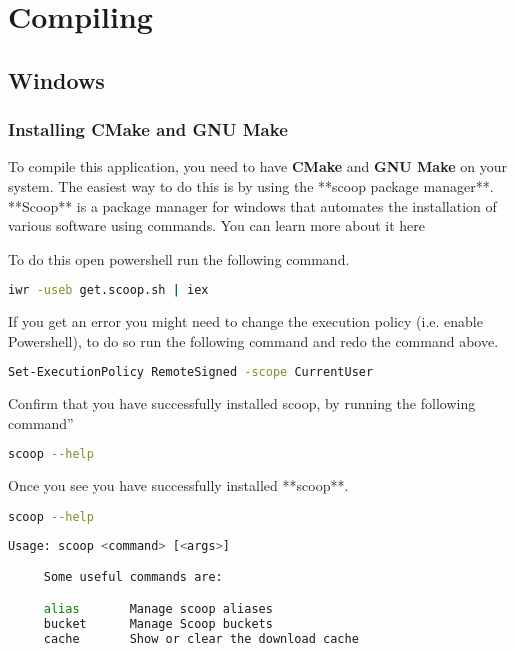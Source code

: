 \section{Compiling}
\subsection{Windows}
\subsubsection{Installing CMake and GNU Make}


To compile this application, you need to have \textbf{CMake}  and \textbf{GNU
Make} on your system.  The easiest way to do this is by using the **scoop
package manager**. **Scoop** is a package manager for windows that automates the
installation of various software using commands. You can learn more about it
here


To do this open powershell run the following command.

\begin{lstlisting}[language=bash]
    iwr -useb get.scoop.sh | iex
\end{lstlisting}

If you get an error you might need to change the execution policy (i.e. enable Powershell), to do so run the following command and redo the command above.

\begin{lstlisting}[language=bash]
    Set-ExecutionPolicy RemoteSigned -scope CurrentUser
\end{lstlisting}

Confirm that you have successfully installed scoop, by running the following command”

\begin{lstlisting}[language=bash]
    scoop --help
\end{lstlisting}

Once you see  you have successfully installed **scoop**.

\begin{lstlisting}[language=bash]
    scoop --help
\end{lstlisting}

\begin{lstlisting}[language=bash]
     Usage: scoop <command> [<args>]

     Some useful commands are:

     alias       Manage scoop aliases
     bucket      Manage Scoop buckets
     cache       Show or clear the download cache
\end{lstlisting}


